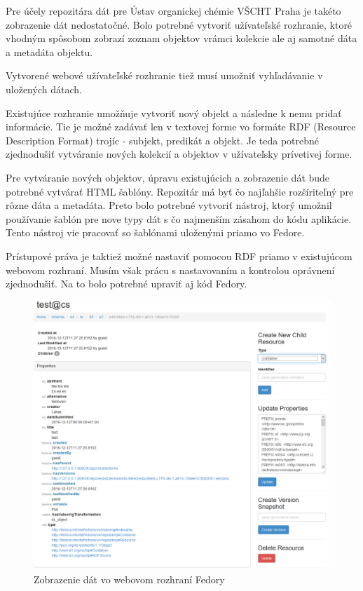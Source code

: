 \documentclass[thesis=M,slovak]{FITthesis}[2013/05/06]
\begin{document}
Pre účely repozitára dát pre Ústav organickej chémie VŠCHT Praha je takéto zobrazenie dát nedostatočné. Bolo potrebné vytvoriť užívateľské rozhranie, ktoré vhodným spôsobom zobrazí zoznam objektov vrámci kolekcie ale aj samotné dáta a metadáta objektu.

Vytvorené webové užívateľské rozhranie tiež musí umožniť vyhľadávanie v uložených dátach.

Existujúce rozhranie umožňuje vytvoriť nový objekt a následne k nemu pridať informácie. Tie je možné zadávať len v textovej forme vo formáte RDF (Resource Description Format) trojíc - subjekt, predikát a objekt. Je teda potrebné zjednodušiť vytváranie nových kolekcií a objektov v užívateľsky prívetivej forme.

Pre vytváranie nových objektov, úpravu existujúcich a zobrazenie dát bude potrebné vytvárať HTML šablóny. Repozitár má byť čo najľahšie rozšíriteľný pre rôzne dáta a metadáta. Preto bolo potrebné vytvoriť nástroj, ktorý umožnil používanie šablón pre nove typy dát s čo najmenším zásahom do kódu aplikácie. Tento nástroj vie pracovať so šablónami uloženými priamo vo Fedore.

Prístupové práva je taktiež možné nastaviť pomocou RDF priamo v existujúcom webovom rozhraní. Musím však prácu s nastavovaním a kontrolou oprávnení zjednodušiť. Na to bolo potrebné upraviť aj kód Fedory.

\begin{figure}\centering
	\includegraphics[width=1.0\textwidth]{fedora/dcterms_vo_Fedore.png}
 	\caption[Zobrazenie dát vo webovom rozhraní Fedory]{Zobrazenie dát vo webovom rozhraní Fedory}\label{graphics:fedora}
\end{figure}
\end{document}
